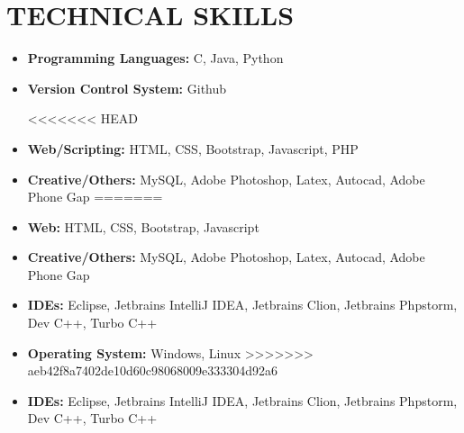 \documentclass[11pt]{article} %
\newcommand{\NewPart}[1]{\section*{\uppercase{#1}}}
\begin{document}
\NewPart{    Technical Skills}{}

\vspace{0pt}

\begin{itemize}
\itemsep-0.5em 
\item \textbf{Programming Languages:} C, Java, Python

\item \textbf{Version Control System:} Github
\vspace{0pt}

<<<<<<< HEAD
\item \textbf{Web/Scripting:} HTML, CSS, Bootstrap, Javascript, PHP
\item \textbf{Creative/Others:} MySQL, Adobe Photoshop, Latex, Autocad, Adobe Phone Gap
=======
\item \textbf{Web:} HTML, CSS, Bootstrap, Javascript
\item \textbf{Creative/Others:} MySQL, Adobe Photoshop, Latex, Autocad, Adobe Phone Gap

\item \textbf{IDEs:}  Eclipse, Jetbrains IntelliJ IDEA, Jetbrains Clion, Jetbrains Phpstorm, Dev C++, Turbo C++

\item \textbf{Operating System:} Windows, Linux
>>>>>>> aeb42f8a7402de10d60c98068009e333304d92a6

\item \textbf{IDEs:}  Eclipse, Jetbrains IntelliJ IDEA, Jetbrains Clion, Jetbrains Phpstorm, Dev C++, Turbo C++
\end{itemize}
\end{document}
